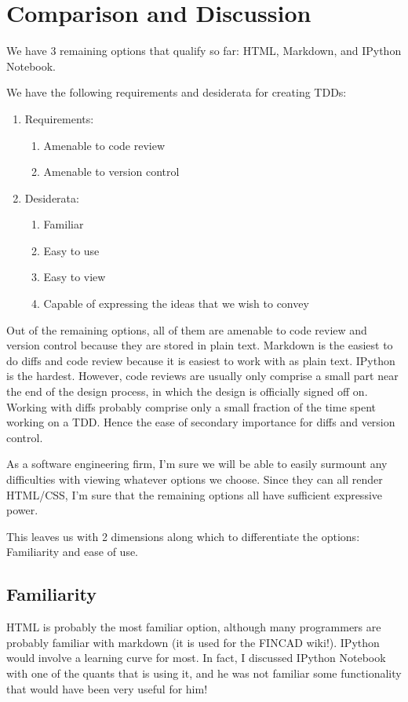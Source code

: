 \documentclass[]{article}
\begin{document}
		


\section{Comparison and Discussion}
We have 3 remaining options that qualify so far: HTML, Markdown, and IPython Notebook.

We have the following requirements and desiderata for creating TDDs:

\begin{enumerate}
	\item Requirements:
		\begin{enumerate}
			\item Amenable to code review
			\item Amenable to version control
		\end{enumerate}
	\item Desiderata:
		\begin{enumerate}
			\item Familiar
			\item Easy to use
			\item Easy to view
			\item Capable of expressing the ideas that we wish to convey			
		\end{enumerate}
\end{enumerate}

Out of the remaining options, all of them are amenable to code review and version control because they are stored in plain text.  
Markdown is the easiest to do diffs and code review because it is easiest to work with as plain text.  
IPython is the hardest.  However, code reviews are usually only comprise a small part near the end of the design process, 
in which the design is officially signed off on.  Working with diffs probably comprise only a small fraction of the time spent working on a TDD.  
Hence the ease of secondary importance for diffs and version control.

As a software engineering firm, I'm sure we will be able to easily surmount any difficulties with viewing whatever options we choose.  
Since they can all render HTML/CSS, I'm sure that the remaining options all have sufficient expressive power.

This leaves us with 2 dimensions along which to differentiate the options: Familiarity and ease of use.


\subsection{Familiarity}
HTML is probably the most familiar option, although many programmers are probably familiar with markdown 
(it is used for the FINCAD wiki!).  IPython would involve a learning curve for most.  In fact, I discussed 
IPython Notebook with one of the quants that is using it, and he was not familiar some functionality that 
would have been very useful for him!
\end{document}
